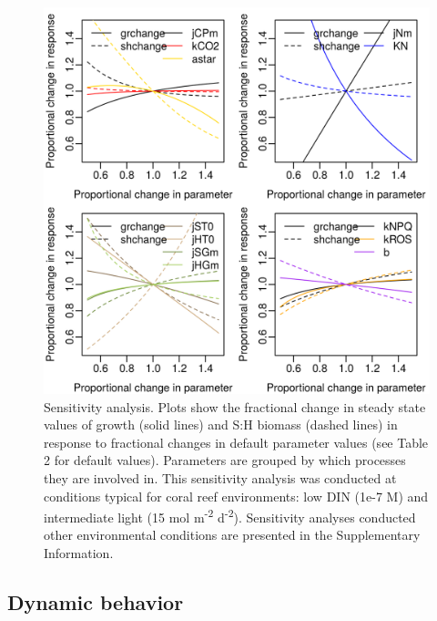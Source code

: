 \documentclass[]{elsarticle} %
\makeatletter
\def\maxwidth{\ifdim\Gin@nat@width>\linewidth\linewidth
\else\Gin@nat@width\fi}
\let\Oldincludegraphics\includegraphics
\renewcommand{\includegraphics}[1]{\Oldincludegraphics[width=\maxwidth]{#1}}
\makeatother
\begin{document}
\begin{figure}[htbp]
\centering
\includegraphics{../img/Fig3.png}
\caption{Sensitivity analysis. Plots show the fractional change in
steady state values of growth (solid lines) and S:H biomass (dashed
lines) in response to fractional changes in default parameter values
(see Table 2 for default values). Parameters are grouped by which
processes they are involved in. This sensitivity analysis was conducted
at conditions typical for coral reef environments: low DIN (1e-7 M) and
intermediate light (15 mol m\textsuperscript{-2} d\textsuperscript{-2}).
Sensitivity analyses conducted other environmental conditions are
presented in the Supplementary Information.}
\end{figure}

\subsection{Dynamic behavior}\label{dynamic-behavior}
\end{document}

